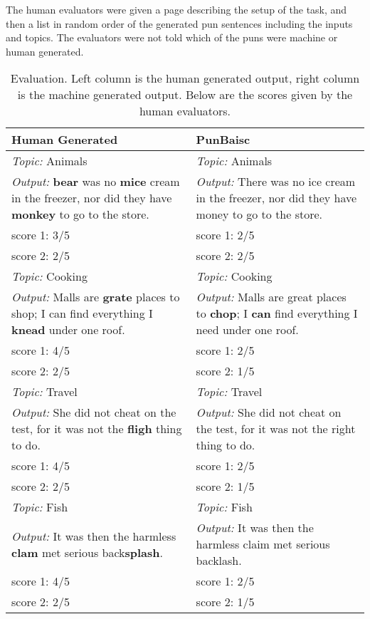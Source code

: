 \documentclass{article}
\begin{document}
The human evaluators were given a page describing the setup of the task, and then a list in random order of the generated pun sentences including the inputs and topics. The evaluators were not told which of the puns were machine or human generated.\\ 

\begin{table}
  \centering
  \begin{tabular}{|P{7cm}|P{7cm}|}
    \hline
    Human Generated         & PunBaisc              \\ \hline
    \textit{Topic:} Animals   & \textit{Topic:} Animals \\
    \textit{Output:} \textbf{bear} was no \textbf{mice} cream in the freezer, nor did they have \textbf{monkey} to go to the store. & \textit{Output:} There was no ice cream in the freezer, nor did they have money to go to the store. \\
    score 1: 3/5            & score 1: 2/5\\
    score 2: 2/5            & score 2: 2/5          \\ \hline
    \textit{Topic:} Cooking   & \textit{Topic:} Cooking \\
    \textit{Output:} Malls are \textbf{grate} places to shop; I can find everything I \textbf{knead} under one roof. & \textit{Output:} Malls are great places to \textbf{chop}; I \textbf{can} find everything I need under one roof. \\
    score 1: 4/5            & score 1: 2/5\\
    score 2: 2/5            & score 2: 1/5          \\ \hline
    \textit{Topic:} Travel   & \textit{Topic:} Travel \\
    \textit{Output:} She did not cheat on the test, for it was not the \textbf{fligh} thing to do. & \textit{Output:} She did not cheat on the test, for it was not the right thing to do. \\
    score 1: 4/5            & score 1: 2/5\\
    score 2: 2/5            & score 2: 1/5          \\ \hline
    \textit{Topic:} Fish  & \textit{Topic:} Fish \\
    \textit{Output:} It was then the harmless \textbf{clam} met serious back\textbf{splash}. & \textit{Output:} It was then the harmless claim met serious backlash. \\
    score 1: 4/5            & score 1: 2/5\\
    score 2: 2/5            & score 2: 1/5          \\ \hline
  \end{tabular}
  \newline\newline
  \caption{Evaluation. Left column is the human generated output, right column is the machine generated output. Below are the scores given by the human evaluators.}\label{tab1}
\end{table}
\end{document}
